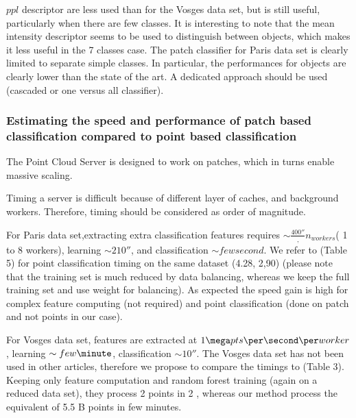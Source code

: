 		  $ppl$ descriptor are less used than for the Vosges data set, but is still useful, particularly when there are few classes.
		  It is interesting to note that the mean intensity descriptor seems to be used to distinguish between objects, which makes it less useful in the 7 classes case.
		  The patch classifier for Paris data set is clearly limited to separate simple classes. In particular, the performances for objects are clearly lower than the state of the art. A dedicated approach should be used (cascaded or one versus all classifier). 
	  
	  
	  \subsubsection{Estimating the speed and performance of patch based classification compared to point based classification}
		  The Point Cloud Server is designed to work on patches, which in turns enable massive scaling.
		  
		  Timing a server is difficult because of different layer of caches, and background workers. Therefore, timing should be considered as order of magnitude.
		  
		  For Paris data set,extracting extra classification features requires $\sim \frac{400 \second},{n_{workers}}$( 1 to 8 workers), learning $\sim 210 \second$,
		  and classification $\sim few second$.
		  We refer to \cite{Weinmann2015}(Table 5) for point classification timing on the same dataset (4.28\hour, 2\second,90\second ) (please note that the training set is much reduced by data balancing, whereas we keep the full training set and use weight for balancing).
		  As expected the speed gain is high for complex feature computing (not required) and point classification (done on patch and not points in our case).
		  
		  For Vosges data set, features are extracted at $1 \mega pts \per \second \per worker$, learning $\sim few \minute$, classification $\sim 10 \second$.
		  The Vosges data set has not been used in other articles, therefore we propose to compare the timings to \cite{shapovalov2010} (Table 3). Keeping only feature computation and random forest training (again on a reduced data set), they process 2 \mega points in 2 \minute, whereas our method process the equivalent of 5.5 B points in few minutes.
		  

